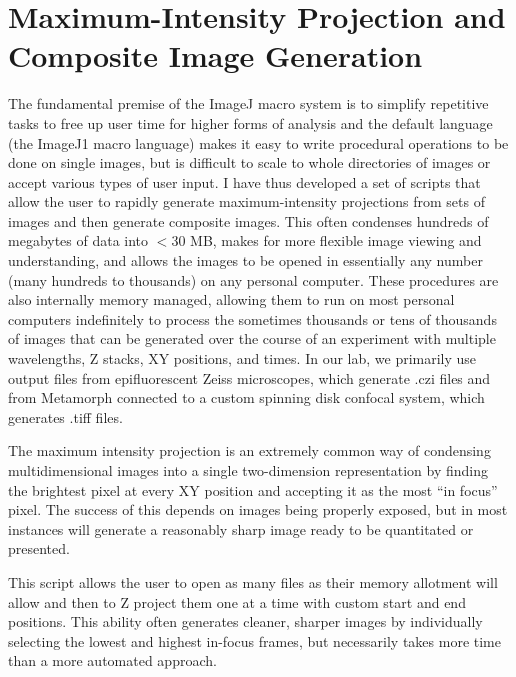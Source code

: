 \section{Maximum-Intensity Projection and Composite Image Generation}\label{mippers}

The fundamental premise of the ImageJ macro system is to simplify repetitive tasks to free up user time for higher forms of analysis and the default language (the ImageJ1 macro language) makes it easy to write procedural operations to be done on single images, but is difficult to scale to whole directories of images or accept various types of user input. I have thus developed a set of scripts that allow the user to rapidly generate maximum-intensity projections from sets of images and then generate composite images. This often condenses hundreds of megabytes of data into $<$30 MB, makes for more flexible image viewing and understanding, and allows the images to be opened in essentially any number (many hundreds to thousands) on any personal computer. These procedures are also internally memory managed, allowing them to run on most personal computers indefinitely to process the sometimes thousands or tens of thousands of images that can be generated over the course of an experiment with multiple wavelengths, Z stacks, XY positions, and times. In our lab, we primarily use output files from epifluorescent Zeiss microscopes, which generate .czi files and from Metamorph connected to a custom spinning disk confocal system, which generates .tiff files.

The maximum intensity projection is an extremely common way of condensing multidimensional images into a single two-dimension representation by finding the brightest pixel at every XY position and accepting it as the most ``in focus'' pixel. The success of this depends on images being properly exposed, but in most instances will generate a reasonably sharp image ready to be quantitated or presented.

\begin{code}
\caption{This script allows the user to open as many files as their memory allotment will allow and then to Z project them one at a time with custom start and end positions. This ability often generates cleaner, sharper images by individually selecting the lowest and highest in-focus frames, but necessarily takes more time than a more automated approach.}
\label{slowmanmip}

\inputminted[breaklines,frame=single,fontsize=\small]{python}{source/manMIPper.py}

\end{code}

